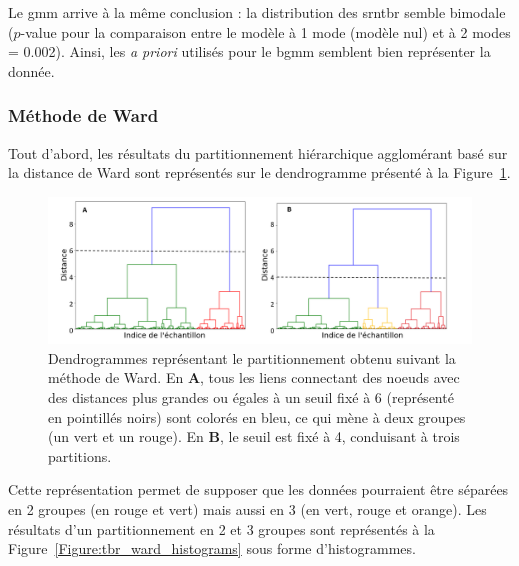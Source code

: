 Le \gls{gmm} arrive à la même conclusion : la distribution des \gls{srntbr} semble bimodale ($p$-value pour la comparaison
entre le modèle à 1 mode (modèle nul) et à 2 modes = 0.002). Ainsi, les \textit{a priori} utilisés pour le \gls{bgmm} semblent bien 
représenter la donnée. 

\subsubsection{Méthode de Ward}
Tout d'abord, les résultats du partitionnement hiérarchique agglomérant basé sur la distance de Ward sont représentés sur le dendrogramme présenté à la 
Figure~\ref{Figure:tbr_ward_dendrogram}. 

\begin{figure}[h!]
  \centering
	\includegraphics[width=1\linewidth]{figures/chapter-4/tbr-dendrogram-ward} 
  \caption[Dendrogrammes représentant le partitionnement obtenu suivant la méthode de Ward.]{Dendrogrammes représentant le partitionnement obtenu suivant 
	la méthode de Ward. En \textbf{A}, tous les liens connectant des noeuds 
	avec des distances plus grandes ou égales à un seuil fixé à 6 (représenté en pointillés noirs) sont colorés en bleu, ce qui mène à deux groupes	
	(un vert et un rouge). En \textbf{B}, le seuil est fixé à 4, conduisant à trois partitions.}
  \label{Figure:tbr_ward_dendrogram}
\end{figure}

Cette représentation permet de supposer que les données pourraient être séparées en 2 groupes (en rouge et vert) 
mais aussi en 3 (en vert, rouge et orange). Les résultats d'un partitionnement en 2 et 3 groupes sont représentés 
à la Figure~\ref{Figure:tbr_ward_histograms} sous forme d'histogrammes.

